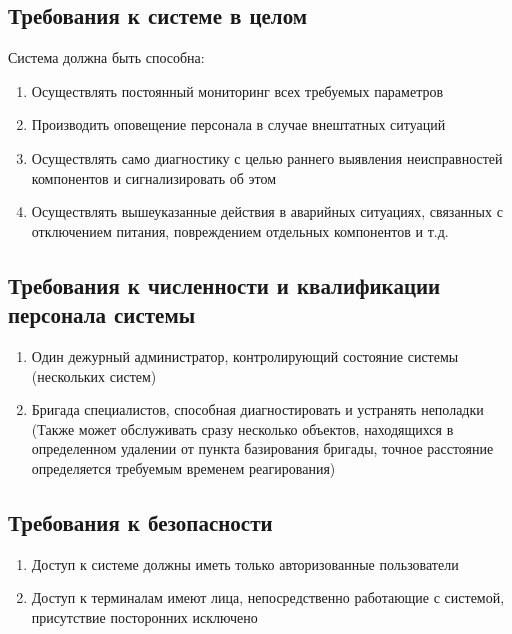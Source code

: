 \subsection{Требования к системе в целом}
Система должна быть способна:
\begin{enumerate}
	\itemsep0em
	\item Осуществлять постоянный мониторинг всех требуемых параметров
	\item Производить оповещение персонала в случае внештатных ситуаций
	\item Осуществлять само диагностику с целью раннего выявления неисправностей компонентов и сигнализировать об этом
	\item Осуществлять вышеуказанные действия в аварийных ситуациях, связанных с отключением питания, повреждением отдельных компонентов и т.д.
\end{enumerate}

\subsection{Требования к численности и квалификации персонала системы}
\begin{enumerate}
	\itemsep0em
	\item Один дежурный администратор, контролирующий состояние системы (нескольких систем)
	\item Бригада специалистов, способная диагностировать и устранять неполадки (Также может обслуживать сразу несколько объектов, находящихся в определенном удалении от пункта базирования бригады, точное расстояние определяется требуемым временем реагирования)
	\end{enumerate}
\subsection{Требования к безопасности}
\begin{enumerate}
	\itemsep0em
	\item Доступ к системе должны иметь только авторизованные пользователи
	\item Доступ к терминалам имеют лица, непосредственно работающие с системой, присутствие посторонних исключено
\end{enumerate}